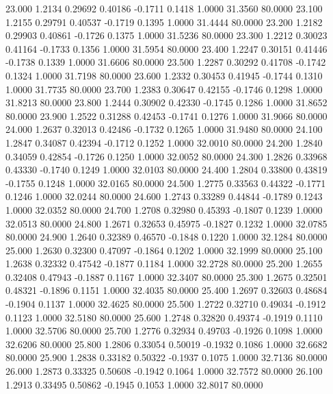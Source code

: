   23.000   1.2134   0.29692   0.40186  -0.1711   0.1418   1.0000  31.3560  80.0000
  23.100   1.2155   0.29791   0.40537  -0.1719   0.1395   1.0000  31.4444  80.0000
  23.200   1.2182   0.29903   0.40861  -0.1726   0.1375   1.0000  31.5236  80.0000
  23.300   1.2212   0.30023   0.41164  -0.1733   0.1356   1.0000  31.5954  80.0000
  23.400   1.2247   0.30151   0.41446  -0.1738   0.1339   1.0000  31.6606  80.0000
  23.500   1.2287   0.30292   0.41708  -0.1742   0.1324   1.0000  31.7198  80.0000
  23.600   1.2332   0.30453   0.41945  -0.1744   0.1310   1.0000  31.7735  80.0000
  23.700   1.2383   0.30647   0.42155  -0.1746   0.1298   1.0000  31.8213  80.0000
  23.800   1.2444   0.30902   0.42330  -0.1745   0.1286   1.0000  31.8652  80.0000
  23.900   1.2522   0.31288   0.42453  -0.1741   0.1276   1.0000  31.9066  80.0000
  24.000   1.2637   0.32013   0.42486  -0.1732   0.1265   1.0000  31.9480  80.0000
  24.100   1.2847   0.34087   0.42394  -0.1712   0.1252   1.0000  32.0010  80.0000
  24.200   1.2840   0.34059   0.42854  -0.1726   0.1250   1.0000  32.0052  80.0000
  24.300   1.2826   0.33968   0.43330  -0.1740   0.1249   1.0000  32.0103  80.0000
  24.400   1.2804   0.33800   0.43819  -0.1755   0.1248   1.0000  32.0165  80.0000
  24.500   1.2775   0.33563   0.44322  -0.1771   0.1246   1.0000  32.0244  80.0000
  24.600   1.2743   0.33289   0.44844  -0.1789   0.1243   1.0000  32.0352  80.0000
  24.700   1.2708   0.32980   0.45393  -0.1807   0.1239   1.0000  32.0513  80.0000
  24.800   1.2671   0.32653   0.45975  -0.1827   0.1232   1.0000  32.0785  80.0000
  24.900   1.2640   0.32389   0.46570  -0.1848   0.1220   1.0000  32.1284  80.0000
  25.000   1.2630   0.32300   0.47097  -0.1864   0.1202   1.0000  32.1999  80.0000
  25.100   1.2638   0.32332   0.47542  -0.1877   0.1184   1.0000  32.2728  80.0000
  25.200   1.2655   0.32408   0.47943  -0.1887   0.1167   1.0000  32.3407  80.0000
  25.300   1.2675   0.32501   0.48321  -0.1896   0.1151   1.0000  32.4035  80.0000
  25.400   1.2697   0.32603   0.48684  -0.1904   0.1137   1.0000  32.4625  80.0000
  25.500   1.2722   0.32710   0.49034  -0.1912   0.1123   1.0000  32.5180  80.0000
  25.600   1.2748   0.32820   0.49374  -0.1919   0.1110   1.0000  32.5706  80.0000
  25.700   1.2776   0.32934   0.49703  -0.1926   0.1098   1.0000  32.6206  80.0000
  25.800   1.2806   0.33054   0.50019  -0.1932   0.1086   1.0000  32.6682  80.0000
  25.900   1.2838   0.33182   0.50322  -0.1937   0.1075   1.0000  32.7136  80.0000
  26.000   1.2873   0.33325   0.50608  -0.1942   0.1064   1.0000  32.7572  80.0000
  26.100   1.2913   0.33495   0.50862  -0.1945   0.1053   1.0000  32.8017  80.0000
